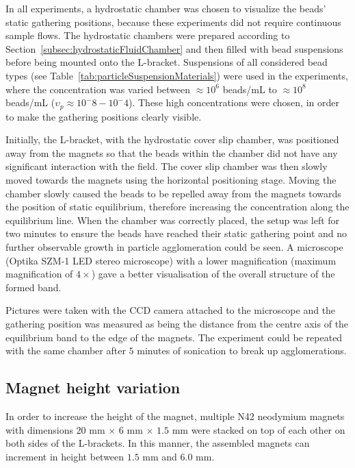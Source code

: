 In all experiments, a hydrostatic chamber was chosen to visualize the beads' static gathering positions, because these experiments did not require continuous sample flows. The hydrostatic chambers were prepared according to Section~\ref{subsec:hydrostaticFluidChamber} and then filled with bead suspensions before being mounted onto the L-bracket. Suspensions of all considered bead types (see Table~\ref{tab:particleSuspensionMaterials}) were used in the experiments, where the concentration was varied between $\approx10^6$ beads/mL to $\approx10^8$ beads/mL ($\upsilon_{p} \approx {10^-8}-{10^-4}$). These high concentrations were chosen, in order to make the gathering positions clearly visible. 

Initially, the L-bracket, with the hydrostatic cover slip chamber, was positioned away from the magnets so that the beads within the chamber did not have any significant interaction with the field. The cover slip chamber was then slowly moved towards the magnets using the horizontal positioning stage. Moving the chamber slowly caused the beads to be repelled away from the magnets towards the position of static equilibrium, therefore increasing the concentration along the equilibrium line. When the chamber was correctly placed, the setup was left for two minutes to ensure the beads have reached their static gathering point and no further observable growth in particle agglomeration could be seen. A microscope (Optika SZM-1 LED stereo microscope) with a lower magnification (maximum magnification of $4\times$) gave a better visualisation of the overall structure of the formed band.

Pictures were taken with the CCD camera attached to the microscope and the gathering position was measured as being the distance from the centre axis of the equilibrium band to the edge of the magnets. The experiment could be repeated with the same chamber after $5$ minutes of sonication to break up agglomerations.

\subsection{Magnet height variation}\label{subsec:magnetHeightVariation}
In order to increase the height of the magnet, multiple N42 neodymium magnets with dimensions $20$ mm $\times$ $6$ mm $\times$ $1.5$ mm were stacked on top of each other on both sides of the L-brackets. In this manner, the assembled magnets can increment in height between $1.5$ mm and $6.0$ mm. 

